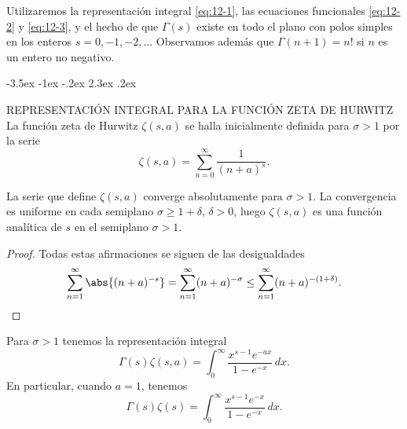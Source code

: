 \documentclass[12pt,a4paper]{book}
\makeatletter
\renewcommand\section{\@startsection{section}{1}{\z@}%
  {-3.5ex \@plus -1ex \@minus -.2ex}%
  {2.3ex \@plus .2ex}%
  {\normalfont\Large\bfseries\raggedright}}
\makeatother
\begin{document}
    Utilizaremos la representación integral \eqref{eq:12-1}, las ecuaciones funcionales
    \eqref{eq:12-2} y \eqref{eq:12-3}, y el hecho de que $\Gamma(s)$ existe en todo el plano
    con polos simples en los enteros $s=0,-1,-2,\dots$ Observamos además que $\Gamma(n+1)=n!$
    si $n$ es un entero no negativo.

    \section{REPRESENTACIÓN INTEGRAL PARA LA FUNCIÓN ZETA DE HURWITZ}
    La función zeta de Hurwitz $\zeta(s,a)$ se halla inicialmente definida para $\sigma>1$ por
    la serie
    \begin{equation*}
        \zeta(s,a)=\sum_{n=0}^{\infty}\frac{1}{(n+a)^{s}}.
    \end{equation*}

    \begin{teorema}\label{teo:12-1}
        La serie que define $\zeta(s,a)$ converge absolutamente para $\sigma>1$. La convergencia
        es uniforme en cada semiplano $\sigma\geq1+\delta$, $\delta>0$, luego $\zeta(s,a)$ es
        una función analítica de $s$ en el semiplano $\sigma>1$.
    \end{teorema}

    \begin{proof}
        Todas estas afirmaciones se siguen de las desigualdades
        \begin{equation*}
            \sum_{n=1}^{\infty}\abs{(n+a)^{-s}}=\sum_{n=1}^{\infty}(n+a)^{-\sigma}\leq\sum_{n=1}^{\infty}(n+a)^{-(1+\delta)}.\qedhere
        \end{equation*}
    \end{proof}

    \begin{teorema}\label{teo:12-2}
        Para $\sigma>1$ tenemos la representación integral
        \begin{equation}\label{eq:12-5}
            \Gamma(s)\zeta(s,a)=\int_{0}^{\infty}\frac{x^{s-1}e^{-ax}}{1-e^{-x}}\,dx.
        \end{equation}
        En particular, cuando $a=1$, tenemos
        \begin{equation*}
            \Gamma(s)\zeta(s)=\int_{0}^{\infty}\frac{x^{s-1}e^{-x}}{1-e^{-x}}\,dx.
        \end{equation*}
    \end{teorema}
\end{document}

